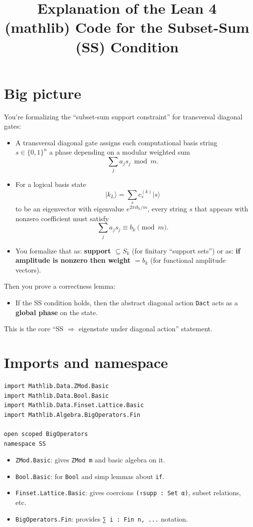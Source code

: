 \documentclass[11pt]{article}
\title{Explanation of the Lean 4 (mathlib) Code for the Subset-Sum (SS) Condition}
\author{}
\date{}
\newcommand{\ket}[1]{\lvert #1 \rangle}
\begin{document}
\maketitle

\section*{Big picture}

You’re formalizing the “subset-sum support constraint” for transversal diagonal gates:

\begin{itemize}
\item A transversal diagonal gate assigns each computational basis string $s\in\{0,1\}^n$ a phase depending on a modular weighted sum
\[
\sum_j a_j s_j \bmod m.
\]
\item For a logical basis state
\[
\ket{k_L}=\sum_s c^{(k)}_s \ket{s}
\]
to be an eigenvector with eigenvalue $e^{2\pi i b_k/m}$, every string $s$ that appears with nonzero coefficient must satisfy
\[
\sum_j a_j s_j \equiv b_k \pmod m.
\]
\item You formalize that as: \textbf{support $\subseteq S_k$} (for finitary “support sets”) or as: \textbf{if amplitude is nonzero then weight $=b_k$} (for functional amplitude vectors).
\end{itemize}

Then you prove a correctness lemma:

\begin{itemize}
\item If the SS condition holds, then the abstract diagonal action \texttt{Dact} acts as a \textbf{global phase} on the state.
\end{itemize}

This is the core “SS $\Rightarrow$ eigenstate under diagonal action” statement.

\section*{Imports and namespace}

\begin{lstlisting}
import Mathlib.Data.ZMod.Basic
import Mathlib.Data.Bool.Basic
import Mathlib.Data.Finset.Lattice.Basic
import Mathlib.Algebra.BigOperators.Fin

open scoped BigOperators
namespace SS
\end{lstlisting}

\begin{itemize}
\item \texttt{ZMod.Basic}: gives \texttt{ZMod m} and basic algebra on it.
\item \texttt{Bool.Basic}: for \texttt{Bool} and simp lemmas about \texttt{if}.
\item \texttt{Finset.Lattice.Basic}: gives coercions \texttt{(↑supp : Set α)}, subset relations, etc.
\item \texttt{BigOperators.Fin}: provides \texttt{∑ i : Fin n, ...} notation.
\end{itemize}
\end{document}
